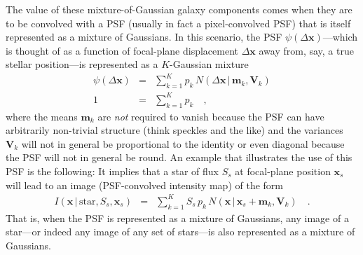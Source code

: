 \documentclass[12pt,pdftex,preprint]{aastex}
\newcommand{\tmatrix}[1]{\boldsymbol{#1}}
\newcommand{\tvector}[1]{\boldsymbol{#1}}
\newcommand{\pos}{\tvector{x}}
\newcommand{\mean}{\tvector{m}}
\newcommand{\var}{\tmatrix{V}\!}
\newcommand{\normal}{N}
\newcommand{\given}{\,|\,}
\renewcommand{\star}{\mathrm{star}}
\begin{document}
The value of these mixture-of-Gaussian galaxy components comes when
they are to be convolved with a PSF (usually in fact a pixel-convolved
PSF) that is itself represented as a mixture of Gaussians.  In this
scenario, the PSF $\psi(\Delta\pos)$---which is thought of as a
function of focal-plane displacement $\Delta\pos$ away from, say, a
true stellar position---is represented as a $K$-Gaussian mixture
\begin{eqnarray}\displaystyle
\psi(\Delta\pos) &=& \sum_{k=1}^K p_k\,\normal(\Delta\pos\given\mean_k,\var_k)
\\
1 &=& \sum_{k=1}^K p_k
\quad ,
\end{eqnarray}
where the means $\mean_k$ are \emph{not} required to vanish because
the PSF can have arbitrarily non-trivial structure (think speckles and
the like) and the variances $\var_k$ will not in general be
proportional to the identity or even diagonal because the PSF will not
in general be round.  An example that illustrates the use of this PSF
is the following: It implies that a star of flux $S_s$ at focal-plane
position $\pos_s$ will lead to an image (PSF-convolved intensity map)
of the form
\begin{eqnarray}\displaystyle
I(\pos\given\star,S_s,\pos_s) &=& \sum_{k=1}^K S_s\,p_k\,\normal(\pos\given\pos_s+\mean_k,\var_k)
\quad .
\end{eqnarray}
That is, when the PSF is represented as a mixture of Gaussians, any
image of a star---or indeed any image of any set of stars---is also
represented as a mixture of Gaussians.
\end{document}
